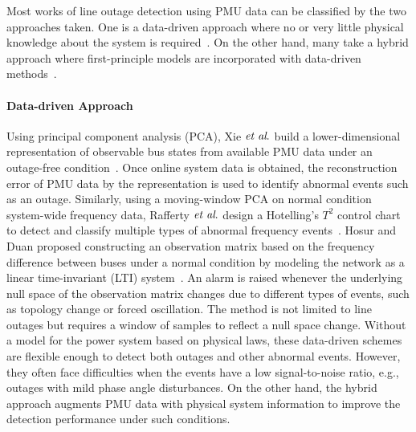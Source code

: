 Most works of line outage detection using PMU data can be classified by the two approaches taken. One is a data-driven approach where no or very little physical knowledge about the system is required~\cite{Xie2014, Rafferty2016, Hosur2019}. On the other hand, many take a hybrid approach where first-principle models are incorporated with data-driven methods~\cite{Jamei2016, Jamei2017a, ardakanian2017event, Ardakanian2019a, Tate2008, tate2009double, dai2020line,Chen2016, Rovatsos2017}. 

\paragraph{Data-driven Approach}
Using principal component analysis (PCA), Xie $\textit{et al}.$ build a lower-dimensional representation of observable bus states from available PMU data under an outage-free condition~\cite{Xie2014}. Once online system data is obtained, the reconstruction error of PMU data by the representation is used to identify abnormal events such as an outage. 
Similarly, using a moving-window PCA on normal condition system-wide frequency data, Rafferty $\textit{et al}.$ design a Hotelling’s $T^2$ control chart to detect and classify multiple types of abnormal frequency events~\cite{Rafferty2016}. 
Hosur and Duan proposed constructing an observation matrix based on the frequency difference between buses under a normal condition by modeling the network as a linear time-invariant (LTI) system~\cite{Hosur2019}. An alarm is raised whenever the underlying null space of the observation matrix changes due to different types of events, such as topology change or forced oscillation. The method is not limited to line outages but requires a window of samples to reflect a null space change. Without a model for the power system based on physical laws, these data-driven schemes are flexible enough to detect both outages and other abnormal events. However, they often face difficulties when the events have a low signal-to-noise ratio, e.g., outages with mild phase angle disturbances. On the other hand, the hybrid approach augments PMU data with physical system information to improve the detection performance under such conditions.

